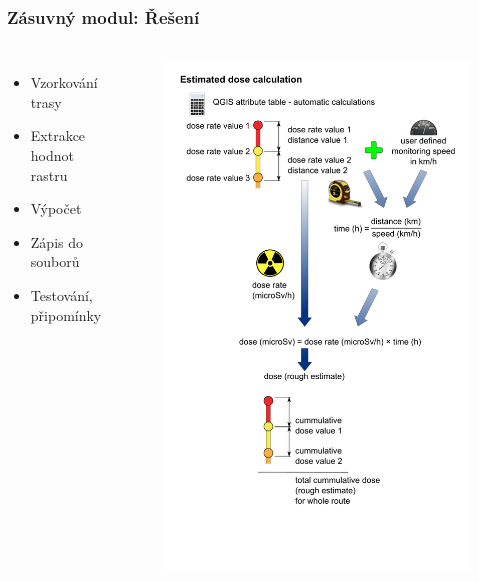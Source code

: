 \documentclass{beamer}
\begin{document}
\begin{frame}
\frametitle{Zásuvný modul: Řešení}
\begin{columns}
\begin{itemize}
	\item Vzorkování trasy
	\item Extrakce hodnot rastru
	\item Výpočet
	\item Zápis do souborů
	\item Testování, připomínky
\end{itemize}
\begin{figure}[H] \centering
		\includegraphics[scale=0.22]{./pictures/computation.png}
\end{figure}
\end{columns}


\end{frame}
\end{document}
